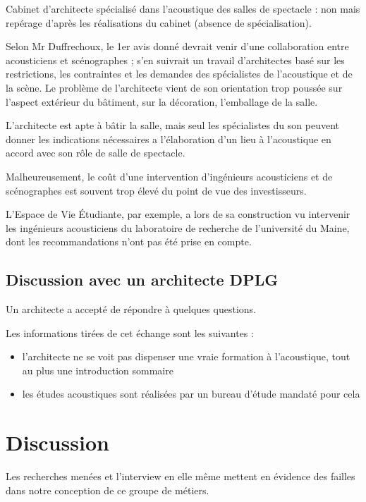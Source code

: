 \documentclass[a4paper, 11pt]{report}
\begin{document}
Cabinet d'architecte spécialisé dans l'acoustique des salles de spectacle : non mais repérage d'après les réalisations du cabinet  (absence de spécialisation).

Selon Mr {\sc Duffrechoux}, le 1er avis donné devrait venir d'une collaboration entre acousticiens et scénographes ; s'en suivrait un travail d'architectes basé sur les restrictions, les contraintes et les demandes des spécialistes de l'acoustique et de la scène.
Le problème de l'architecte vient de son orientation trop poussée sur l'aspect extérieur du bâtiment, sur la décoration, l'emballage de la salle.

L'architecte est apte à bâtir la salle, mais seul les spécialistes du son peuvent donner les indications nécessaires a l'élaboration d'un lieu à l'acoustique en accord avec son rôle de salle de spectacle.

Malheureusement, le coût d'une intervention d'ingénieurs acousticiens et de scénographes est souvent trop élevé du point de vue des investisseurs.


L'Espace de Vie Étudiante, par exemple, a lors de sa construction vu intervenir les ingénieurs acousticiens du laboratoire de recherche de l'université du Maine, dont les recommandations n'ont pas été prise en compte.

\subsection{Discussion avec un architecte DPLG}

Un architecte a accepté de répondre à quelques questions.

Les informations tirées de cet échange sont les suivantes : 

\begin{itemize}
    \item l'architecte ne se voit pas dispenser une vraie formation à l'acoustique, tout au plus une introduction sommaire
    \item les études acoustiques sont réalisées par un bureau d'étude mandaté pour cela
\end{itemize}


\section{Discussion}

Les recherches menées et l'interview en elle même mettent en évidence des failles dans notre conception de ce groupe de métiers.
\end{document}
